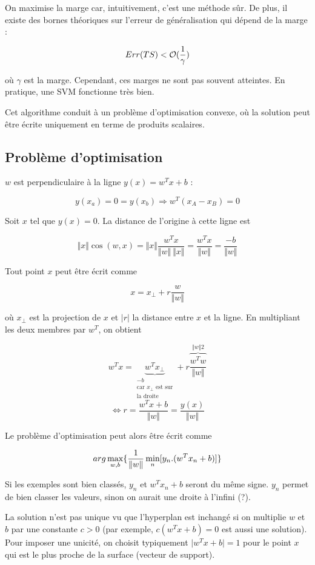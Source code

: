 	On maximise la marge car, intuitivement, c'est une méthode sûr. De plus, il existe des bornes théoriques sur l'erreur de généralisation qui dépend de la marge :
	
	$$Err(TS) < \mathcal{O} (\frac{1}{\gamma})$$
	
	où $\gamma$ est la marge. Cependant, ces marges ne sont pas souvent atteintes. En pratique, une SVM fonctionne très bien.
	
	Cet algorithme conduit à un problème d'optimisation convexe, où la solution peut être écrite uniquement en terme de produits scalaires.
	
	\subsection{Problème d'optimisation}
	
	
	$w$ est perpendiculaire à la ligne $y(x) = w^Tx + b$ :
	
	$$y(x_a) = 0 = y(x_b) \Rightarrow w^T(x_A - x_B) = 0$$
	
	Soit $x$ tel que $y(x) = 0$. La distance de l'origine à cette ligne est
	
	$$\Vert x \Vert \cos(w, x) = \Vert x \Vert \frac{w^T x}{\Vert w \Vert \: \Vert x \Vert} = \frac{w^Tx}{\Vert w \Vert} = \frac{-b}{\Vert w \Vert}$$
	
	Tout point $x$ peut être écrit comme
	
	$$x = x_{\perp} + r \frac{w}{\Vert w \Vert}$$
	
	où $x_{\perp}$ est la projection de $x$ et $\vert r \vert$ la distance entre $x$ et la ligne. En multipliant les deux membres par $w^T$, on obtient
	
	$$w^Tx = \underbrace{w^T x_{\perp}}_{\substack{-b\\ \text{car } x_{\perp} \text{ est sur} \\ \text{la droite}}} + r \frac{\overbrace{w^T w}^{\Vert w \Vert2}}{\Vert w \Vert}$$
	$$\Leftrightarrow r = \frac{w^Tx + b}{\Vert w \Vert} = \frac{y(x)}{\Vert w \Vert}$$
	
	Le problème d'optimisation peut alors être écrit comme 
	
	$$arg \max_{w, b} \lbrace \frac{1}{\Vert w \Vert} \min_n [y_n . (w^T x_n + b)] \rbrace$$
	
	Si les exemples sont bien classés, $y_n$ et $w^Tx_n + b$ seront du même signe. $y_n$ permet de bien classer les valeurs, sinon on aurait une droite à l'infini (?).
	
	La solution n'est pas unique vu que l'hyperplan est inchangé si  on multiplie $w$ et $b$ par une constante $c > 0$ (par exemple, $c (w^Tx + b) = 0$ est aussi une solution). Pour imposer une unicité, on choisit typiquement $\vert w^T x + b \vert = 1$ pour le point $x$ qui est le plus proche de la surface (vecteur de support).
	
